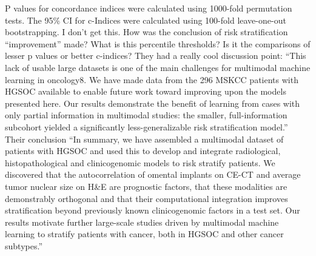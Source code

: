 \documentclass{article}%
\begin{document}
\newline%
\newline%
%
P values for concordance indices were calculated using 1000{-}fold permutation tests. The 95\% CI for c{-}Indices were calculated using 100{-}fold leave{-}one{-}out bootstrapping. I don’t get this. %
\newline%
\newline%
%
How was the conclusion of risk stratification “improvement” made?%
\newline%
\newline%
%
What is this percentile thresholds? %
\newline%
\newline%
%
Is it the comparisons of lesser p values or better c{-}indices? %
\newline%
\newline%
%
They had a really cool discussion point:%
\newline%
\newline%
%
“This lack of usable large datasets is one of the main challenges for multimodal machine learning in oncology8. We have made data from the 296 MSKCC patients with HGSOC available to enable future work toward improving upon the models presented here. Our results demonstrate the benefit of learning from cases with only partial information in multimodal studies: the smaller, full{-}information subcohort yielded a significantly less{-}generalizable risk stratification model.”%
\newline%
\newline%
%
Their conclusion%
\newline%
\newline%
%
“In summary, we have assembled a multimodal dataset of patients with HGSOC and used this to develop and integrate radiological, histopathological and clinicogenomic models to risk stratify patients. We discovered that the autocorrelation of omental implants on CE{-}CT and average tumor nuclear size on H\&E are prognostic factors, that these modalities are demonstrably orthogonal and that their computational integration improves stratification beyond previously known clinicogenomic factors in a test set. Our results motivate further large{-}scale studies driven by multimodal machine learning to stratify patients with cancer, both in HGSOC and other cancer subtypes.”%
\newline%
\newline%
%
%
\newline%
\newline%
\end{document}
